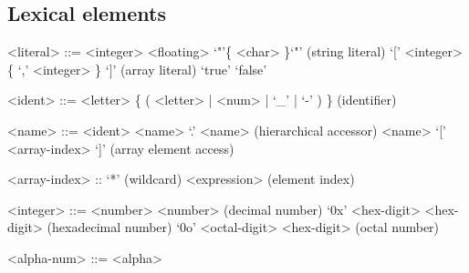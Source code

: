 \subsection{Lexical elements}
\begin{grammar}


  <literal> ::= <integer>
  \alt <floating>
  \alt `"'\{ <char> \}`"' (string literal)
  \alt `[' <integer> \{ `,' <integer> \} `]' (array literal)  
  \alt `true'
  \alt `false'

  <ident> ::= <letter> \{ ( <letter> | <num> | `_' | `-' ) \} (identifier)

  <name> ::= <ident>
  \alt <name> `.' <name> (hierarchical accessor)
  \alt <name> `[' <array-index> `]' (array element access)

  <array-index> :: `*' (wildcard)
  \alt <expression> (element index)

  <integer> ::= <number> { <number> } (decimal number)
  \alt `0x' <hex-digit> { <hex-digit> } (hexadecimal number)
  \alt `0o' <octal-digit> { <hex-digit> } (octal number)

  <alpha-num> ::= <alpha>
  
\end{grammar}

